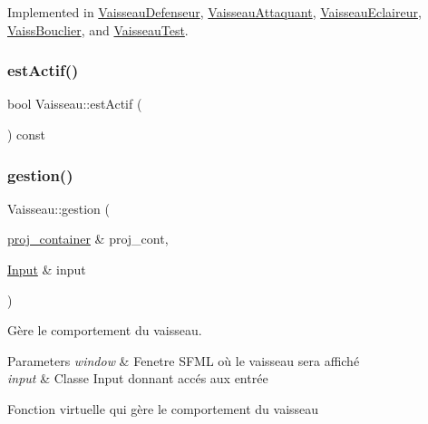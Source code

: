Implemented in \mbox{\hyperlink{class_vaisseau_defenseur_aeaaaa161533c6aa07b627172d8657b3a}{Vaisseau\+Defenseur}}, \mbox{\hyperlink{class_vaisseau_attaquant_a9afe1d07b85b6064c802205a1d0d777b}{Vaisseau\+Attaquant}}, \mbox{\hyperlink{class_vaisseau_eclaireur_ab4ea82a8fc92dc27c6072481099518bc}{Vaisseau\+Eclaireur}}, \mbox{\hyperlink{class_vaiss_bouclier_ab154712cec76a589fd8bce2392982c5b}{Vaiss\+Bouclier}}, and \mbox{\hyperlink{class_vaisseau_test_a5cab0817183471868c5ed6392261f8ec}{Vaisseau\+Test}}.

\mbox{\label{class_vaisseau_a4f0c76d144f9f5f41b254bde4eb350da}} 
\subsubsection{\texorpdfstring{est\+Actif()}{estActif()}}
{\footnotesize\ttfamily bool Vaisseau\+::est\+Actif (\begin{DoxyParamCaption}{ }\end{DoxyParamCaption}) const\hspace{0.3cm}{\ttfamily [inline]}}

\mbox{\label{class_vaisseau_aece43c3acf0e125226a03209f66c5eb4}} 
\subsubsection{\texorpdfstring{gestion()}{gestion()}}
{\footnotesize\ttfamily Vaisseau\+::gestion (\begin{DoxyParamCaption}\item[{\mbox{\hyperlink{def__type_8h_a87980cd8ee9533e561a73e8bbc728188}{proj\+\_\+container}} \&}]{proj\+\_\+cont,  }\item[{\mbox{\hyperlink{_input_8h_a5588d60d674991c719a8df848313e966}{Input}} \&}]{input }\end{DoxyParamCaption})\hspace{0.3cm}{\ttfamily [pure virtual]}}



Gère le comportement du vaisseau. 


\begin{DoxyParams}{Parameters}
{\em window} & Fenetre S\+F\+ML où le vaisseau sera affiché \\
\hline
{\em input} & Classe Input donnant accés aux entrée\\
\hline
\end{DoxyParams}
Fonction virtuelle qui gère le comportement du vaisseau 

